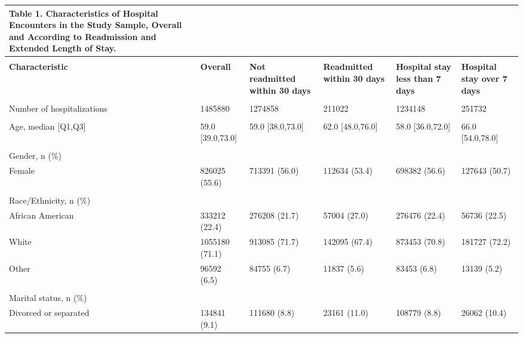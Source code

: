 %
\begin{adjustbox}{width={\textwidth},totalheight={\textheight},keepaspectratio,frame,padding=0ex 0ex -910ex 0ex}%
\sffamily %
{%
\begin{tabular}{L{20em}C{10em}C{10em}C{10em}C{10em}C{10em}}%
{{\textbf{\color{NEJMRed} Table 1.}}%
\textbf{Characteristics  of Hospital Encounters in the Study Sample, Overall and According to Readmission and Extended Length of Stay.}}\\[10pt]%
\hline%
& & & & & \\%
\textbf{Characteristic} & \textbf{Overall} & \textbf{Not readmitted within 30 days} & \textbf{Readmitted within 30 days} & \textbf{Hospital stay less than 7 days} & \textbf{Hospital stay over 7 days}\\
&  &  &  &  & \\
Number of hospitalizations & 1485880 & 1274858 & 211022 & 1234148 & 251732\\
&  &  &  &  & \\
Age, median [Q1,Q3] & 59.0 [39.0,73.0] & 59.0 [38.0,73.0] & 62.0 [48.0,76.0] & 58.0 [36.0,72.0] & 66.0 [54.0,78.0]\\
&  &  &  &  & \\
Gender, n (\%) & &    &     &        &         \\
\hspace{3mm} Female & 826025 (55.6) & 713391 (56.0) & 112634 (53.4) & 698382 (56.6) & 127643 (50.7)\\
&  &  &  &  & \\
Race/Ethnicity, n (\%) & &    &     &        &         \\
\hspace{3mm} African American & 333212 (22.4) & 276208 (21.7) & 57004 (27.0) & 276476 (22.4) & 56736 (22.5)\\
\hspace{3mm} White & 1055180 (71.1) & 913085 (71.7) & 142095 (67.4) & 873453 (70.8) & 181727 (72.2)\\
\hspace{3mm} Other & 96592 (6.5) & 84755 (6.7) & 11837 (5.6) & 83453 (6.8) & 13139 (5.2)\\
&  &  &  &  & \\
Marital status, n (\%)  & &    &     &        &         \\
\hspace{3mm} Divorced or separated & 134841 (9.1) & 111680 (8.8) & 23161 (11.0) & 108779 (8.8) & 26062 (10.4)\\

\end{tabular}}
\end{adjustbox}
